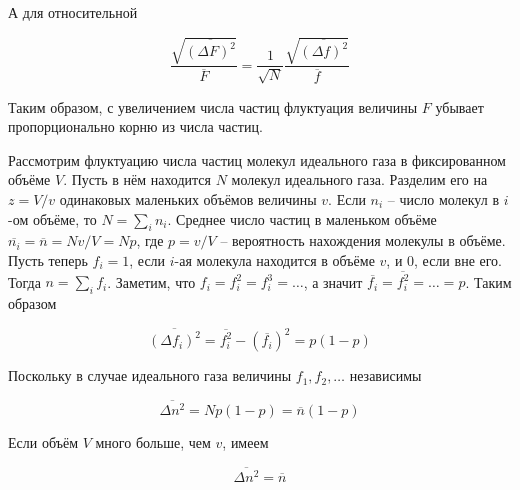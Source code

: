 \noindent
А для относительной

\begin{equation}
    \frac{\sqrt{\overline{\left( \Delta F \right)^2}}}{\overline{F}} = \frac{1}{\sqrt{N}} \frac{\sqrt{\overline{\left( \Delta f \right)^2}}}{\overline{f}}
\end{equation}

\noindent
Таким образом, с увеличением числа частиц флуктуация величины $F$ убывает пропорционально корню из числа частиц.

Рассмотрим флуктуацию числа частиц молекул идеального газа в фиксированном объёме $V$. Пусть в нём находится $N$ молекул идеального газа. Разделим его на $z = V / v$ одинаковых маленьких объёмов величины $v$. Если $n_i$ -- число молекул в $i$-ом объёме, то $N = \sum_i n_i$. Среднее число частиц в маленьком объёме $\overline{n_i} = \overline{n} = N v / V = N p$, где $p = v / V$ -- вероятность нахождения молекулы в объёме. Пусть теперь $f_i = 1$, если $i$-ая молекула находится в объёме $v$, и 0, если вне его. Тогда $n = \sum_i f_i$. Заметим, что $f_i = f_i^2 = f_i^3 = \dots$, а значит $\overline{f_i} = \overline{f_i^2} = \dots = p$. Таким образом

\begin{equation}
    \overline{\left( \Delta f_i \right)^2} = \overline{f_i^2} - \left( \overline{f_i} \right)^2 = p \left( 1 - p \right)
\end{equation}

\noindent
Поскольку в случае идеального газа величины $f_1, f_2, \dots$ независимы

\begin{equation}
    \overline{\Delta n^2} = N p \left( 1 - p \right) = \overline{n} \left( 1 - p \right)
\end{equation}

\noindent
Если объём $V$ много больше, чем $v$, имеем

\begin{equation}
    \overline{\Delta n^2} = \overline{n}
\end{equation}